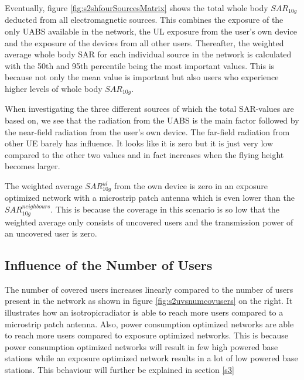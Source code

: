 Eventually, figure \ref{fig:s2shfourSourcesMatrix} shows the total whole body $SAR_{10g}$ deducted from all electromagnetic sources. This combines the exposure 
of the only \gls{UABS} available in the network, 
the \gls{UL} exposure from the user’s own device and the exposure of the devices from all other users. 
Thereafter, the weighted average whole body \gls{SAR} for each individual source in the network is calculated with the 50th and 95th percentile 
being the most important values. This is because not only the mean value is important but also users who experience higher 
levels of whole body $SAR_{10g}$.

When investigating the three different sources of which the total \gls{SAR}-values are based on, we see 
that the radiation from the \gls{UABS} is the main factor followed by the near-field radiation from the user's own device.
The far-field radiation from other \gls{UE} barely has influence. 
It looks like it is zero but it is just very low compared to the other two values and in fact increases when the flying height becomes larger.

The weighted average $SAR^{ul}_{10g}$ from the own device is zero in an exposure optimized network with a microstrip patch antenna 
which is even lower than the $SAR^{neighbours}_{10g}$.
This is because the coverage in this scenario is so low that the weighted average 
only consists of uncovered users and the transmission power of an uncovered user is zero.

\FloatBarrier
\subsection{Influence of the Number of Users}
\label{s2b}

The number of covered users increases linearly compared to the number of users present in the network as shown in figure 
\ref{fig:s2uvsnumcovusers} on the right. It illustrates how an \gls{isotropicradiator} is able to reach more users 
compared to a microstrip patch antenna. Also, power consumption optimized networks are able to reach more users compared to exposure optimized networks.
This is because power consumption optimized networks will result in few high powered base stations while an 
exposure optimized network results in a lot of low powered base stations. This behaviour will further be explained in section \ref{s3}

